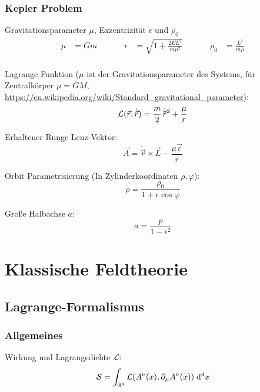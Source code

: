 \documentclass[11pt]{article}
\numberwithin{equation}{section}
\begin{document}
			\subsubsection{Kepler Problem}
				\noindent
				Gravitationsparameter $\mu$, Exzentrizität $\epsilon$ und $\rho_0$
				\begin{equation}
					\begin{aligned}
						\mu &= G m &\hspace{30pt}
						\epsilon &= \sqrt{1+\frac{2 E L^2}{m \mu^2}} &\hspace{30pt}
						\rho_0 &= \frac{L^2}{m\mu} \\
					\end{aligned}
				\end{equation}

				\noindent
				Lagrange Funktion ($\mu$ ist der Gravitationsparameter des Systems, für Zentralkörper $\mu=GM$, \url{https://en.wikipedia.org/wiki/Standard_gravitational_parameter}):
				\begin{equation}
					\mathcal{L}(\vec{r},\dot{\vec{r}}) = \frac{m}{2} \dot{\pvec{r}}^2 + \frac{\mu}{r}
				\end{equation}

				\noindent
				Erhaltener Runge Lenz-Vektor:
				\begin{equation}
					\vec{A} = \dot{\vec{r}}\times\vec{L} - \frac{\mu \vec{r}}{r}
				\end{equation}

				\noindent
				Orbit Parametrisierung (In Zylinderkoordinaten $\rho, \varphi$):
				\begin{equation}
					\rho = \frac{\rho_0}{1+\epsilon \cos\varphi}
				\end{equation}

				\noindent
				Große Halbachse $a$:
				\begin{equation}
					a = \frac{p}{1-\epsilon^2}
				\end{equation}

	\newpage
	\section{Klassische Feldtheorie}
		\subsection{Lagrange-Formalismus}
			\subsubsection{Allgemeines}
				\noindent
				Wirkung und Lagrangedichte $\mathcal{L}$:
				\begin{equation}
					\mathcal{S} = \int_{\mathbb{R}^4} \mathcal{L}(A^\nu(x),\partial_\mu A^\nu(x)) \;\mathrm{d}^4 x
				\end{equation}
\end{document}
